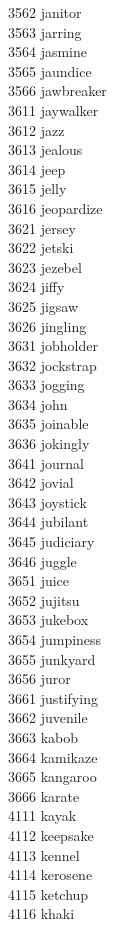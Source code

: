 3562 janitor \\
3563 jarring \\
3564 jasmine \\
3565 jaundice \\
3566 jawbreaker \\
3611 jaywalker \\
3612 jazz \\
3613 jealous \\
3614 jeep \\
3615 jelly \\
3616 jeopardize \\
3621 jersey \\
3622 jetski \\
3623 jezebel \\
3624 jiffy \\
3625 jigsaw \\
3626 jingling \\
3631 jobholder \\
3632 jockstrap \\
3633 jogging \\
3634 john \\
3635 joinable \\
3636 jokingly \\
3641 journal \\
3642 jovial \\
3643 joystick \\
3644 jubilant \\
3645 judiciary \\
3646 juggle \\
3651 juice \\
3652 jujitsu \\
3653 jukebox \\
3654 jumpiness \\
3655 junkyard \\
3656 juror \\
3661 justifying \\
3662 juvenile \\
3663 kabob \\
3664 kamikaze \\
3665 kangaroo \\
3666 karate \\
4111 kayak \\
4112 keepsake \\
4113 kennel \\
4114 kerosene \\
4115 ketchup \\
4116 khaki \\
